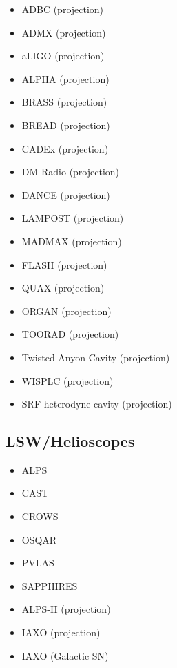 \documentclass[9pt,twocolumn]{extarticle}
\begin{document}
\begin{mdframed}[everyline=true]
\begin{itemize}
	\item ADBC (projection)~\cite{Liu:2018icu} 
	\item ADMX (projection)~\cite{Stern:2016bbw}
              \item aLIGO (projection)~\cite{Nagano:2019rbw} 
           \item ALPHA (projection)~\cite{Lawson:2019brd,Millar:2022peq} 
           \item BRASS (projection)~\cite{BRASS}
           \item BREAD (projection)~\cite{Liu:2021pei}
           \item CADEx (projection)~\cite{Aja:2022csb}
    \item DM-Radio (projection)~\cite{DMRadio,DMRadio:2022pkf}
     \item DANCE (projection)~\cite{Michimura:2019qxr} 
           \item LAMPOST (projection)~\cite{Baryakhtar:2018doz} 
      \item MADMAX (projection)~\cite{Beurthey:2020yuq} 
           \item FLASH (projection)~\cite{Alesini:2017ifp,FLASH} 
           \item QUAX (projection)~\cite{QUAX} 
                 \item ORGAN (projection)~\cite{McAllister:2017lkb} 
                       \item TOORAD (projection)~\cite{Schutte-Engel:2021bqm} 
                       \item Twisted Anyon Cavity (projection)~\cite{Bourhill:2022alm}
                       \item WISPLC (projection)~\cite{Zhang:2021bpa} 
                       \item SRF heterodyne cavity (projection)~\cite{Berlin:2020vrk}

\end{itemize}
\vspace{-2.5em}
\subsection*{LSW/Helioscopes}\vspace{-0.5em}
\begin{itemize}\setlength\itemsep{-0.5em}
    \item ALPS~\cite{Ehret:2010mh}
    \item CAST~\cite{CAST:2007jps,CAST:2017uph}
    \item CROWS~\cite{Betz:2013dza}
    \item OSQAR~\cite{OSQAR:2015qdv}
    \item PVLAS~\cite{DellaValle:2015xxa}
    \item SAPPHIRES~\cite{SAPPHIRES:2021vkz,SAPPHIRES:2022bqg}
    \item ALPS-II (projection)~\cite{Ortiz:2020tgs}
    \item IAXO (projection)~\cite{IAXO:2019mpb}
    \item IAXO (Galactic SN)~\cite{Ge:2020zww}
\end{itemize}


\end{mdframed}
\end{document}
